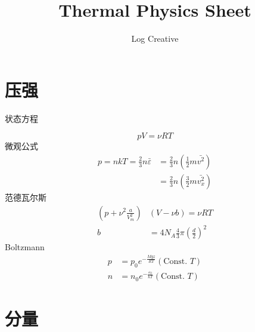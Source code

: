 \documentclass[10pt]{article}
\title{Thermal Physics Sheet}
\author{Log Creative}
\date{}
\numberwithin{equation}{section}
\begin{document}
\begin{multicols}{3}
\begin{CJK}{UTF8}{gbsn} %
\maketitle
\section{压强}
状态方程

\begin{equation}
  pV=\nu RT
\end{equation}
微观公式
\begin{align}\nonumber
  p=nkT=\frac{2}{3}n\bar{\varepsilon}&=\frac{2}{3}n\left(\frac{1}{2}m\bar{v^2}\right) \\ &=\frac{2}{3}n\left(\frac{3}{2}m\bar{v_x^2}\right)
\end{align}
范德瓦尔斯
\begin{align}
  \left(p+\nu^2 \frac{a}{V_m^2}\right)&(V-\nu b)=\nu RT \\
  b&=4N_A \frac{4}{3}\pi \left( \frac{d}{2} \right)^2
\end{align}
Boltzmann
\begin{align}
p&=p_0 e^{-\frac{Mgz}{RT}}(\textrm{Const. }T) \\
n&=n_0 e^{-\frac{\varepsilon_0}{kT}}(\textrm{Const. }T)
\end{align}
\section{分量}


\end{CJK}
\end{multicols}
\end{document}
